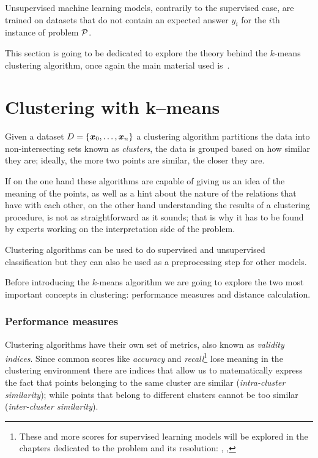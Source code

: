 Unsupervised machine learning models, contrarily to the supervised case, are trained on datasets
that do not contain an expected answer $y_i$ for the $i$th instance of problem $\mathcal{P}$.

This section is going to be dedicated to explore the theory behind the $k$-means clustering
algorithm, once again the main material used is~\cite{ZhouZhi-Hua2021ML}.

\section{Clustering with k--means}
\label{sec:kmeans}
Given a dataset $D = \{\boldsymbol{x}_0, \ldots, \boldsymbol{x}_n\}$ a clustering algorithm partitions the data into non-intersecting sets
known as \emph{clusters}, the data is grouped based on how similar they are; ideally, the more two
points are similar, the closer they are.

If on the one hand these algorithms are capable of giving us an idea of the
meaning of the points, as well as a hint about the nature of the relations that have with each
other, on the other hand understanding the results of a clustering procedure, is not as
straightforward as it sounds; that is why it has to be found by experts working on the
interpretation side of the problem.

Clustering algorithms can be used to do supervised and unsupervised classification but they can also
be used as a preprocessing step for other models.

\medskip

Before introducing the $k$-means algorithm we are going to explore the two most important concepts
in clustering: performance measures and distance calculation.

\subsubsection{Performance measures}
\label{ssec:performance-measures}
Clustering algorithms have their own set of metrics, also known as \emph{validity indices}. Since
common scores like \emph{accuracy} and \emph{recall}\footnote{These and more scores for supervised
learning models will be explored in the chapters dedicated to the problem and its resolution: ,
, } lose meaning in the clustering
environment there are indices that allow us to matematically express the fact that points belonging
to the same cluster are similar (\emph{intra-cluster similarity}); while points that belong to
different clusters cannot be too similar (\emph{inter-cluster similarity}).

